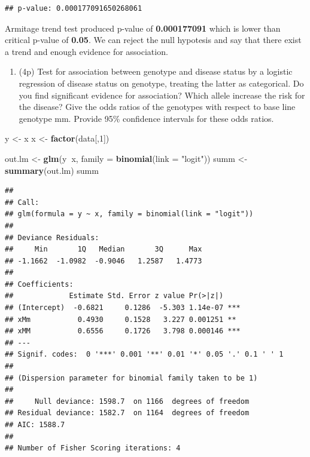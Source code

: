 \documentclass[
]{article}
\newenvironment{Shaded}{\begin{snugshade}}{\end{snugshade}}
\newcommand{\DataTypeTok}[1]{\textcolor[rgb]{0.13,0.29,0.53}{#1}}
\newcommand{\DecValTok}[1]{\textcolor[rgb]{0.00,0.00,0.81}{#1}}
\newcommand{\KeywordTok}[1]{\textcolor[rgb]{0.13,0.29,0.53}{\textbf{#1}}}
\newcommand{\NormalTok}[1]{#1}
\newcommand{\OperatorTok}[1]{\textcolor[rgb]{0.81,0.36,0.00}{\textbf{#1}}}
\newcommand{\StringTok}[1]{\textcolor[rgb]{0.31,0.60,0.02}{#1}}
\providecommand{\tightlist}{%
  \setlength{\itemsep}{0pt}\setlength{\parskip}{0pt}}
\begin{document}
\begin{verbatim}
## p-value: 0.000177091650268061
\end{verbatim}

Armitage trend test produced p-value of \textbf{0.000177091} which is
lower than critical p-value of \textbf{0.05}. We can reject the null
hypotesis and say that there exist a trend and enough evidence for
association.

\begin{enumerate}
\def\labelenumi{\arabic{enumi}.}
\setcounter{enumi}{5}
\tightlist
\item
  (4p) Test for association between genotype and disease status by a
  logistic regression of disease status on genotype, treating the latter
  as categorical. Do you find significant evidence for association?
  Which allele increase the risk for the disease? Give the odds ratios
  of the genotypes with respect to base line genotype mm. Provide 95\%
  confidence intervals for these odds ratios.
\end{enumerate}

\begin{Shaded}
\begin{Highlighting}[]
\NormalTok{y <-}\StringTok{ }\NormalTok{x}
\NormalTok{x <-}\StringTok{ }\KeywordTok{factor}\NormalTok{(data[,}\DecValTok{1}\NormalTok{])}

\NormalTok{out.lm <-}\StringTok{ }\KeywordTok{glm}\NormalTok{(y}\OperatorTok{~}\NormalTok{x, }\DataTypeTok{family =} \KeywordTok{binomial}\NormalTok{(}\DataTypeTok{link =} \StringTok{"logit"}\NormalTok{))}
\NormalTok{summ <-}\StringTok{ }\KeywordTok{summary}\NormalTok{(out.lm)}
\NormalTok{summ}
\end{Highlighting}
\end{Shaded}

\begin{verbatim}
## 
## Call:
## glm(formula = y ~ x, family = binomial(link = "logit"))
## 
## Deviance Residuals: 
##     Min       1Q   Median       3Q      Max  
## -1.1662  -1.0982  -0.9046   1.2587   1.4773  
## 
## Coefficients:
##             Estimate Std. Error z value Pr(>|z|)    
## (Intercept)  -0.6821     0.1286  -5.303 1.14e-07 ***
## xMm           0.4930     0.1528   3.227 0.001251 ** 
## xMM           0.6556     0.1726   3.798 0.000146 ***
## ---
## Signif. codes:  0 '***' 0.001 '**' 0.01 '*' 0.05 '.' 0.1 ' ' 1
## 
## (Dispersion parameter for binomial family taken to be 1)
## 
##     Null deviance: 1598.7  on 1166  degrees of freedom
## Residual deviance: 1582.7  on 1164  degrees of freedom
## AIC: 1588.7
## 
## Number of Fisher Scoring iterations: 4
\end{verbatim}
\end{document}
